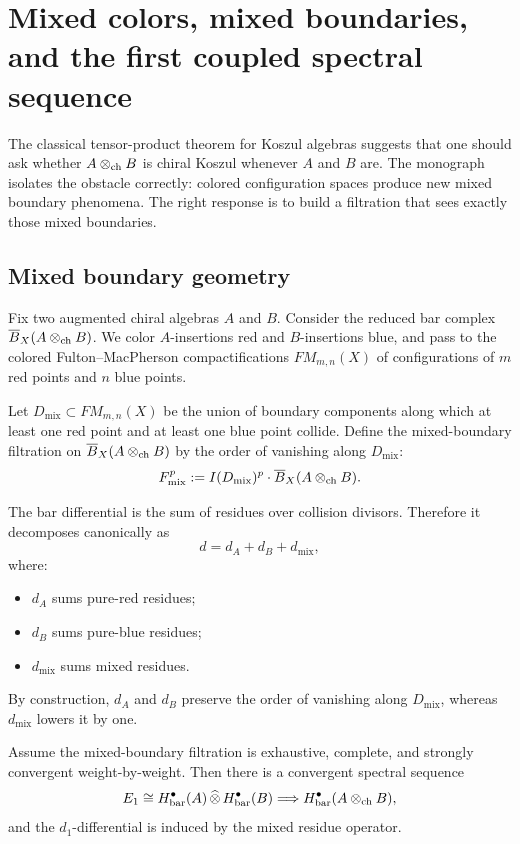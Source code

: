 \section{Mixed colors, mixed boundaries, and the first coupled spectral sequence}

The classical tensor-product theorem for Koszul algebras suggests that one should ask whether \(A\otimes_{\mathrm{ch}} B\) is chiral Koszul whenever \(A\) and \(B\) are. The monograph isolates the obstacle correctly: colored configuration spaces produce new mixed boundary phenomena. The right response is to build a filtration that sees exactly those mixed boundaries.

\subsection{Mixed boundary geometry}

Fix two augmented chiral algebras \(A\) and \(B\). Consider the reduced bar complex \(\overline{B}_X(A\otimes_{\mathrm{ch}} B)\). We color \(A\)-insertions red and \(B\)-insertions blue, and pass to the colored Fulton--MacPherson compactifications \(FM_{m,n}(X)\) of configurations of \(m\) red points and \(n\) blue points.

\begin{definition}
Let \(D_{\mathrm{mix}}\subset FM_{m,n}(X)\) be the union of boundary components along which at least one red point and at least one blue point collide. Define the mixed-boundary filtration on \(\overline{B}_X(A\otimes_{\mathrm{ch}} B)\) by the order of vanishing along \(D_{\mathrm{mix}}\):
\[
F^p_{\mathrm{mix}}:=I(D_{\mathrm{mix}})^p\cdot \overline{B}_X(A\otimes_{\mathrm{ch}} B).
\]
\end{definition}

The bar differential is the sum of residues over collision divisors. Therefore it decomposes canonically as
\[
d=d_A+d_B+d_{\mathrm{mix}},
\]
where:
\begin{itemize}[leftmargin=2em]
\item \(d_A\) sums pure-red residues;
\item \(d_B\) sums pure-blue residues;
\item \(d_{\mathrm{mix}}\) sums mixed residues.
\end{itemize}

By construction, \(d_A\) and \(d_B\) preserve the order of vanishing along \(D_{\mathrm{mix}}\), whereas \(d_{\mathrm{mix}}\) lowers it by one.

\begin{theorem}\label{thm:mixed-sseq}
Assume the mixed-boundary filtration is exhaustive, complete, and strongly convergent weight-by-weight. Then there is a convergent spectral sequence
\[
E_1 \cong H^\bullet_{\mathrm{bar}}(A)\,\widehat\otimes\, H^\bullet_{\mathrm{bar}}(B)
\Longrightarrow
H^\bullet_{\mathrm{bar}}(A\otimes_{\mathrm{ch}} B),
\]
and the \(d_1\)-differential is induced by the mixed residue operator.
\end{theorem}

